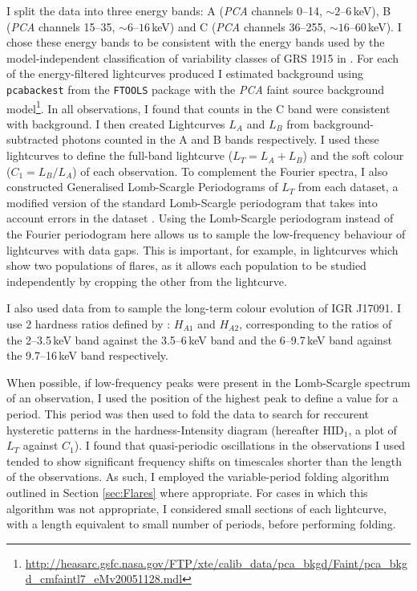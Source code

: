\par I split the data into three energy bands: A (\textit{PCA} channels 0--14, $\sim2$--$6$\,keV), B (\textit{PCA} channels 15--35, $\sim6$--$16$\,keV) and C (\textit{PCA} channels 36--255, $\sim16$--$60$\,keV).  I chose these energy bands to be consistent with the energy bands used by the model-independent classification of variability classes of GRS 1915 in \citet{Belloni_GRS_MI}.  For each of the energy-filtered lightcurves produced I estimated background using \texttt{pcabackest} from the \texttt{FTOOLS} package \citep{Blackburn_FTools} with the \textit{PCA} faint source background model\footnote{\url{http://heasarc.gsfc.nasa.gov/FTP/xte/calib\_data/pca\_bkgd/Faint/pca\_bkgd\_cmfaintl7\_eMv20051128.mdl}}. In all observations, I found that counts in the C band were consistent with background.  I then created Lightcurves $L_A$ and $L_B$ from background-subtracted photons counted in the A and B bands respectively.  I used these lightcurves to define the full-band lightcurve ($L_T=L_A+L_B$) and the soft colour ($C_1=L_B/L_A$) of each observation.  To complement the Fourier spectra, I also constructed Generalised Lomb-Scargle Periodograms of $L_T$ from each dataset, a modified version of the standard Lomb-Scargle periodogram \citep{Lomb_LombScargle, Scargle_LombScargle} that takes into account errors in the dataset \citep{Irwin_LombScargle}.  Using the Lomb-Scargle periodogram instead of the Fourier periodogram here allows us to sample the low-frequency behaviour of lightcurves with data gaps.  This is important, for example, in lightcurves which show two populations of flares, as it allows each population to be studied independently by cropping the other from the lightcurve.
\par I also used data from \citealt{Altamirano_IGR_FH} to sample the long-term colour evolution of IGR J17091.  I use 2 hardness ratios defined by \citeauthor{Altamirano_IGR_FH}: $H_{A1}$ and $H_{A2}$, corresponding to the ratios of the 2--3.5\,keV band against the 3.5--6\,keV band and the 6--9.7\,keV band against the 9.7--16\,keV band respectively.
\par When possible, if low-frequency peaks were present in the Lomb-Scargle spectrum of an observation, I used the position of the highest peak to define a value for a period.  This period was then used to fold the data to search for reccurent hysteretic patterns in the hardness-Intensity diagram (hereafter HID$_1$, a plot of $L_T$ against $C_1$).  I found that quasi-periodic oscillations in the observations I used tended to show significant frequency shifts on timescales shorter than the length of the observations.  As such, I employed the variable-period folding algorithm outlined in Section \ref{sec:Flares} where appropriate.  For cases in which this algorithm was not appropriate, I considered small sections of each lightcurve, with a length equivalent to small number of periods, before performing folding.
